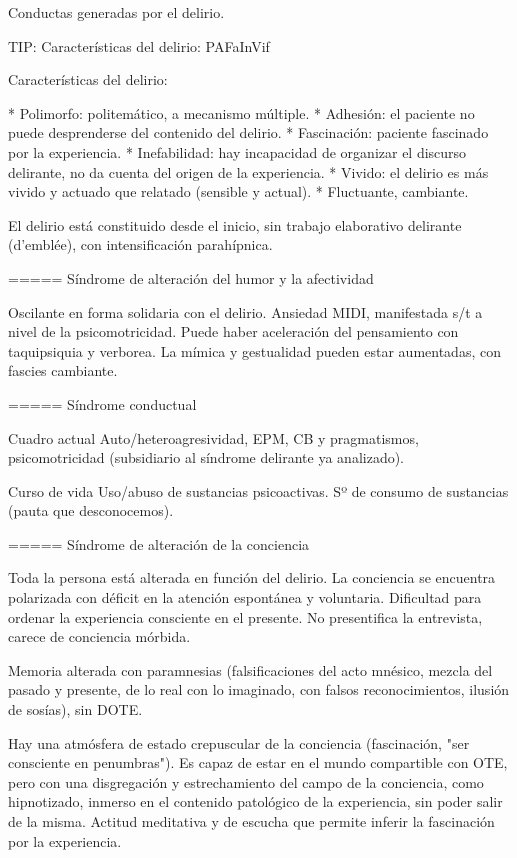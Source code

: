 Conductas generadas por el delirio.

TIP: Características del delirio: PAFaInVif

Características del delirio:

* Polimorfo: politemático, a mecanismo múltiple.
* Adhesión: el paciente no puede desprenderse del contenido del delirio.
* Fascinación: paciente fascinado por la experiencia.
* Inefabilidad: hay incapacidad de organizar el discurso delirante, no da cuenta del origen de la experiencia.
* Vivido: el delirio es más vivido y actuado que relatado (sensible y actual).
* Fluctuante, cambiante.

El delirio está constituido desde el inicio, sin trabajo elaborativo delirante (d'emblée), con intensificación parahípnica.

===== Síndrome de alteración del humor y la afectividad

Oscilante en forma solidaria con el delirio. Ansiedad MIDI, manifestada s/t a nivel de la psicomotricidad. Puede haber aceleración del pensamiento con taquipsiquia y verborea. La mímica y gestualidad pueden estar aumentadas, con fascies cambiante.

===== Síndrome conductual

Cuadro actual Auto/heteroagresividad, EPM, CB y pragmatismos, psicomotricidad (subsidiario al síndrome delirante ya analizado).

Curso de vida Uso/abuso de sustancias psicoactivas. Sº de consumo de sustancias (pauta que desconocemos).

===== Síndrome de alteración de la conciencia

Toda la persona está alterada en función del delirio. La conciencia se encuentra polarizada con déficit en la atención espontánea y voluntaria. Dificultad para ordenar la experiencia consciente en el presente. No presentifica la entrevista, carece de conciencia mórbida.

Memoria alterada con paramnesias (falsificaciones del acto mnésico, mezcla del pasado y presente, de lo real con lo imaginado, con falsos reconocimientos, ilusión de sosías), sin DOTE.

Hay una atmósfera de estado crepuscular de la conciencia (fascinación, "ser consciente en penumbras"). Es capaz de estar en el mundo compartible con OTE, pero con una disgregación y estrechamiento del campo de la conciencia, como hipnotizado, inmerso en el contenido patológico de la experiencia, sin poder salir de la misma. Actitud meditativa y de escucha que permite inferir la fascinación por la experiencia.

